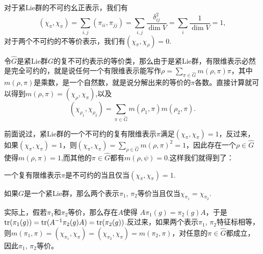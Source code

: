 对于紧Lie群的不可约幺正表示，我们有
\[
(\chi_\pi, \chi_\pi)=\sum_{i,j}(\pi_{ii},\pi_{jj})=\sum_{i,j}\frac{\delta_{ij}^2}{\dim V}=\sum_{i}\frac{1}{\dim V}=1,
\]
对于两个不可约的不等价表示，我们有$(\chi_\pi, \chi_\rho)=0$.

令$\hat{G}$是紧Lie群$G$的复不可约表示的等价类，那么由于是紧Lie群，有限维表示必然是完全可约的，就是说任何一个有限维表示能写作$\rho=\sum_{\pi\in\hat{G}}m(\rho,\pi)\pi$，其中$m(\rho,\pi)$是乘数，是一个自然数，就是说分解出来的等价的$\pi$各数。直接计算就可以得到$m(\rho,\pi)=(\chi_\rho,\chi_\pi)$,以及
\[
	(\chi_{\rho_1},\chi_{\rho_2})=\sum_{\pi\in\hat{G}}m(\rho_1,\pi)m(\rho_2,\pi).
\]

前面说过，紧Lie群的一个不可约的复有限维表示$\pi$满足$(\chi_\pi, \chi_\pi)=1$，反过来，如果$(\chi_\pi, \chi_\pi)=1$，则$(\chi_{\pi},\chi_{\pi})=\sum_{\rho\in\hat{G}}m(\rho,\pi)^2=1$，因此存在一个$\rho\in\hat{G}$使得$m(\rho,\pi)=1$,而其他的$\pi\in\hat{G}$都有$m(\rho,\psi)=0$.这样我们就得到了：

\para 一个复有限维表示$\pi$是不可约的当且仅当$(\chi_{\pi},\chi_{\pi})=1$.

\begin{pro}
如果$G$是一个紧Lie群，那么两个表示$\pi_1$, $\pi_2$等价当且仅当$\chi_{\pi_1}=\chi_{\pi_2}$.
\end{pro}

实际上，假若$\pi_1$和$\pi_2$等价，那么存在$A$使得
$A\pi_1(g)=\pi_2(g)A$，于是$\operatorname{tr}(\pi_1(g))=\operatorname{tr}(A^{-1}\pi_2(g)A)=\operatorname{tr}(\pi_2(g))$.反过来，如果两个表示$\pi_1$, $\pi_2$特征标相等，则$	m(\pi_1,\pi)=(\chi_{\pi_1},\chi_\pi)=(\chi_{\pi_2},\chi_\pi)=m(\pi_2,\pi)$，对任意的$\pi\in\hat{G}$都成立，因此$\pi_1$, $\pi_2$等价。